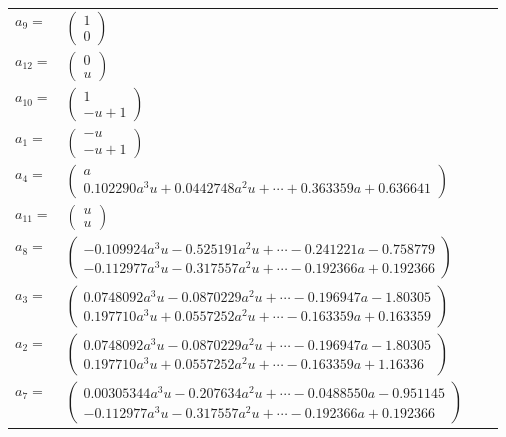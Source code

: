 \documentclass[1p]{elsarticle_modified}
\theoremstyle{definition}
\begin{document}
\begin{tabular}{m{7pt} m{180pt} m{7pt} m{180pt} }
\flushright $a_{9}=$&$\begin{pmatrix}1\\0\end{pmatrix}$ \\
\flushright $a_{12}=$&$\begin{pmatrix}0\\u\end{pmatrix}$ \\
\flushright $a_{10}=$&$\begin{pmatrix}1\\- u+1\end{pmatrix}$ \\
\flushright $a_{1}=$&$\begin{pmatrix}- u\\- u+1\end{pmatrix}$ \\
\flushright $a_{4}=$&$\begin{pmatrix}a\\0.102290 a^{3} u+0.0442748 a^{2} u+\cdots+0.363359 a+0.636641\end{pmatrix}$ \\
\flushright $a_{11}=$&$\begin{pmatrix}u\\u\end{pmatrix}$ \\
\flushright $a_{8}=$&$\begin{pmatrix}-0.109924 a^{3} u-0.525191 a^{2} u+\cdots-0.241221 a-0.758779\\-0.112977 a^{3} u-0.317557 a^{2} u+\cdots-0.192366 a+0.192366\end{pmatrix}$ \\
\flushright $a_{3}=$&$\begin{pmatrix}0.0748092 a^{3} u-0.0870229 a^{2} u+\cdots-0.196947 a-1.80305\\0.197710 a^{3} u+0.0557252 a^{2} u+\cdots-0.163359 a+0.163359\end{pmatrix}$ \\
\flushright $a_{2}=$&$\begin{pmatrix}0.0748092 a^{3} u-0.0870229 a^{2} u+\cdots-0.196947 a-1.80305\\0.197710 a^{3} u+0.0557252 a^{2} u+\cdots-0.163359 a+1.16336\end{pmatrix}$ \\
\flushright $a_{7}=$&$\begin{pmatrix}0.00305344 a^{3} u-0.207634 a^{2} u+\cdots-0.0488550 a-0.951145\\-0.112977 a^{3} u-0.317557 a^{2} u+\cdots-0.192366 a+0.192366\end{pmatrix}$ \\

\end{tabular}
\end{document}
